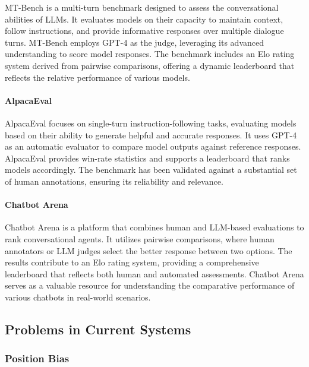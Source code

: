 \documentclass[sigconf, authoryear]{acmart}
\begin{document}
MT-Bench is a multi-turn benchmark designed to assess the conversational abilities of LLMs.
It evaluates models on their capacity to maintain context, follow instructions, and provide informative responses over multiple dialogue turns.
MT-Bench employs GPT-4 as the judge, leveraging its advanced understanding to score model responses.
The benchmark includes an Elo rating system derived from pairwise comparisons, offering a dynamic leaderboard that reflects the relative performance of various models\cite{mtbench}.


\paragraph{AlpacaEval}


AlpacaEval focuses on single-turn instruction-following tasks, evaluating models based on their ability to generate helpful and accurate responses.
It uses GPT-4 as an automatic evaluator to compare model outputs against reference responses.
AlpacaEval provides win-rate statistics and supports a leaderboard that ranks models accordingly.
The benchmark has been validated against a substantial set of human annotations, ensuring its reliability and relevance\cite{alpaca_eval}.


\paragraph{Chatbot Arena}


Chatbot Arena is a platform that combines human and LLM-based evaluations to rank conversational agents.
It utilizes pairwise comparisons, where human annotators or LLM judges select the better response between two options.
The results contribute to an Elo rating system, providing a comprehensive leaderboard that reflects both human and automated assessments.
Chatbot Arena serves as a valuable resource for understanding the comparative performance of various chatbots in real-world scenarios\cite{mtbench}.


\subsection{Problems in Current Systems}\label{subsec:problems-in-current-systems}

\subsubsection{Position Bias}
\end{document}
